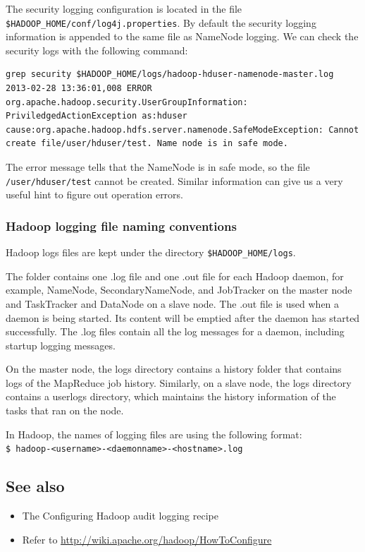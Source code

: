 The security logging configuration is located in the file \verb|$HADOOP_HOME/conf/log4j.properties|. By default the security logging information is appended to the same file as NameNode logging. We can check the security logs with the following command:
\lstset{style=bashstyle}
\begin{lstlisting}
grep security $HADOOP_HOME/logs/hadoop-hduser-namenode-master.log
2013-02-28 13:36:01,008 ERROR org.apache.hadoop.security.UserGroupInformation: PriviledgedActionException as:hduser cause:org.apache.hadoop.hdfs.server.namenode.SafeModeException: Cannot create file/user/hduser/test. Name node is in safe mode.
\end{lstlisting}

The error message tells that the NameNode is in safe mode, so the file \verb|/user/hduser/test| cannot be created. Similar information can give us a very useful hint to figure out operation errors.

\subsubsection*{Hadoop logging file naming conventions}
Hadoop logs files are kept under the directory \verb|$HADOOP_HOME/logs|. 

The folder contains one .log file and one .out file for each Hadoop daemon, for example, NameNode, SecondaryNameNode, and JobTracker on the master node and TaskTracker and DataNode on a slave node. The .out file is used when a daemon is being started. Its content will be emptied after the daemon has started successfully. The .log files contain all the log messages for a daemon, including startup logging messages.

On the master node, the logs directory contains a history folder that contains logs of the MapReduce job history. Similarly, on a slave node, the logs directory contains a userlogs directory, which maintains the history information of the tasks that ran on the node.

In Hadoop, the names of logging files are using the following format: \\
\verb|$ hadoop-<username>-<daemonname>-<hostname>.log |
\subsection*{See also}
\begin{itemize}
  \item The Configuring Hadoop audit logging recipe
  \item Refer to \url{http://wiki.apache.org/hadoop/HowToConfigure}
\end{itemize}
